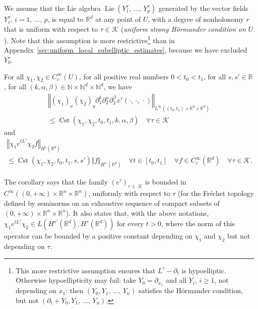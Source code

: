 \documentclass[10pt]{amsart}
\theoremstyle{definition}\newtheorem{defi}[theo]{Definition}\newtheorem{rema}[theo]{Remark}\newtheorem{exam}[theo]{Example}\newtheorem{exem}[theo]{Example}\newtheorem{nota}[theo]{Notation}
\newcommand*\R{\mathbb{R}}
\newcommand*\N{\mathbb{N}}
\newcommand{\calK}{\mathcal{K}}
\DeclareMathOperator{\Cst}{Cst}
\DeclareMathOperator{\Lie}{Lie}
\renewcommand{\geq}{\geqslant}
\renewcommand{\leq}{\leqslant}
\let\oldforall\forall
\renewcommand*{\forall}{\mathrel{\oldforall}}
\begin{document}
\begin{coro}\label{cor_heat_uniform}
We assume that the Lie algebra $\Lie(Y_1^\tau,\,\ldots,\,Y_p^\tau)$ generated by the vector fields $Y_i^\tau$, $i=1,\,\ldots,\,p$, is equal to $\R^d$ at any point of $U$, with a degree of nonholonomy $r$ that is uniform with respect to $\tau\in\calK$ (\emph{uniform strong H\"ormander condition on $U$}). Note that this assumption is more restrictive\footnote{This more restrictive assumption ensures that $L^\tau-\partial_t$ is hypoelliptic. Otherwise hypoellipticity may fail: take $Y_0=\partial_{x_1}$ and all $Y_i$, $i\geq 1$, not depending on $x_1$: then $(Y_0,Y_1,\,\ldots,\,Y_n)$ satisfies the H\"ormander condition, but not $(\partial_t+Y_0,Y_1,\,\ldots,\,Y_n)$.} than in Appendix~\ref{sec:uniform_local_subelliptic_estimates}, because we have excluded $Y_0^\tau$.

For all $\chi_1,\chi_2\in C_c^\infty(U)$, for all positive real numbers $0<t_0<t_1$, for all $s,s'\in\R$, for all $(k,\alpha,\beta)\in\N\times\N^d\times\N^d$, we have
\begin{multline}\label{cor_heat_uniform_e}
\left\Vert (\chi_1)_x (\chi_2)_y \partial_1^k \partial_2^\alpha \partial_3^\beta \, e^\tau(\cdot,\,\cdot,\,\cdot) \right\Vert_{L^\infty\left((t_0,t_1)\times\R^d\times\R^d\right)}\\
\leq \Cst\left(\chi_1,\chi_2,t_0,t_1,k,\alpha,\beta\right)
\quad \forall \tau\in\calK
\end{multline}
and
\begin{multline*}
\left\Vert \chi_1 e^{t L^\tau}\chi_2 f\right\Vert_{H^s\left(\R^d\right)}\\
\leq \Cst\left(\chi_1,\chi_2,t_0,t_1,s,s'\right) \Vert f\Vert_{H^{s'}\left(\R^d\right)}
\quad\forall t\in[t_0,t_1]\quad \forall f\in C_c^\infty\left(\R^d\right)\quad \forall \tau\in\calK.
\end{multline*}
\end{coro}

The corollary says that the family $(e^\tau)_{\tau\,\in\,\calK}$ is bounded in $C^{\infty}((0,+\infty)\times\R^n\times\R^n)$, uniformly with respect to $\tau$ (for the Fréchet topology defined by seminorms on an exhaustive sequence of compact subsets of $(0,+\infty)\times\R^n\times\R^n$). It also states that, with the above notations, $\chi_1 e^{t L^\tau} \chi_2 \in L(H^{s'}(\R^d),H^s(\R^d))$ for every $t>0$, where the norm of this operator can be bounded by a positive constant depending on $\chi_1$ and $\chi_2$ but not depending on $\tau$.
\end{document}
